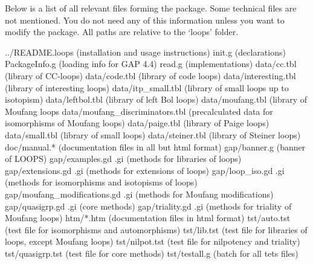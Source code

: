 
Below is a list of all relevant files forming the {\LOOPS} package. Some
technical files are not mentioned. You do not need any of this information
unless you want to modify the package. All paths are relative to the
`loops' folder.

\begintt
../README.loops (installation and usage instructions)
init.g (declarations)
PackageInfo.g (loading info for GAP 4.4)
read.g (implementations)
data/cc.tbl (library of CC-loops)
data/code.tbl (library of code loops)
data/interesting.tbl (library of interesting loops)
data/itp_small.tbl (library of small loops up to isotopism)
data/leftbol.tbl (library of left Bol loops)
data/moufang.tbl (library of Moufang loops
data/moufang_discriminators.tbl (precalculated data for isomorphisms of Moufang loops)
data/paige.tbl (library of Paige loops)
data/small.tbl (library of small loops)
data/steiner.tbl (library of Steiner loops)
doc/manual.* (documentation files in all but html format)
gap/banner.g (banner of LOOPS)
gap/examples.gd .gi (methods for libraries of loops)
gap/extensions.gd .gi (methods for extensions of loops)
gap/loop_iso.gd .gi (methods for isomorphisms and isotopisms of loops)
gap/moufang_modifications.gd .gi (methods for Moufang modifications)
gap/quasigrp.gd .gi (core methods)
gap/triality.gd .gi (methods for triality of Moufang loops)
htm/*.htm (documentation files in html format)
tst/auto.tst (test file for isomorphisms and automorphisms)
tst/lib.tst (test file for libraries of loops, except Moufang loops)
tst/nilpot.tst (test file for nilpotency and triality)
tst/quasigrp.tst (test file for core methods)
tst/testall.g (batch for all tets files)
\endtt

